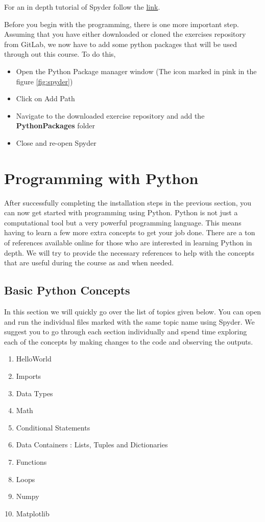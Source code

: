 \documentclass{cmc}
\begin{document}
For an in depth tutorial of Spyder follow the
\href{http://www.southampton.ac.uk/~fangohr/blog/spyder-the-python-ide.html#first-steps-with-spyder}{link}.

Before you begin with the programming, there is one more important
step. Assuming that you have either downloaded or cloned the exercises
repository from GitLab, we now have to add some python packages that will be
used through out this course. To do this,
\begin{itemize}
\item Open the Python Package manager window (The icon marked in pink in the
  figure \ref{fig:spyder})
\item Click on Add Path
\item Navigate to the downloaded exercise repository and add the
  \textbf{PythonPackages} folder
\item Close and re-open Spyder
\end{itemize}

\section{Programming with Python}

After successfully completing the installation steps in the previous section,
you can now get started with programming using Python.  Python is not just a
computational tool but a very powerful programming language. This means having
to learn a few more extra concepts to get your job done.  There are a ton of
references available online for those who are interested in learning Python in
depth. We will try to provide the necessary references to help with the concepts
that are useful during the course as and when needed.

\subsection{Basic Python Concepts}

In this section we will quickly go over the list of topics given below. You can open and run the individual files marked with the same topic name using Spyder.
We suggest you to go through each section individually and spend time exploring each of the concepts by making changes to the code and observing the outputs.

\begin{enumerate}
        \item HelloWorld
	\item Imports
	\item Data Types
	\item Math
	\item Conditional Statements
	\item Data Containers : Lists, Tuples and Dictionaries
	\item Functions
	\item Loops
	\item Numpy
	\item Matplotlib
\end{enumerate}
\end{document}
